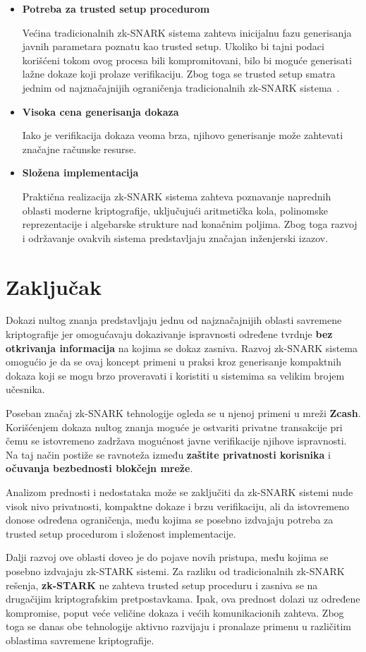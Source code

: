 \begin{itemize}

\item \textbf{Potreba za trusted setup procedurom}

Većina tradicionalnih zk-SNARK sistema zahteva inicijalnu fazu generisanja javnih parametara poznatu kao trusted setup. Ukoliko bi tajni podaci korišćeni tokom ovog procesa bili kompromitovani, bilo bi moguće generisati lažne dokaze koji prolaze verifikaciju. Zbog toga se trusted setup smatra jednim od najznačajnijih ograničenja tradicionalnih zk-SNARK sistema~\cite{nitulescu2023snarks}.

\item \textbf{Visoka cena generisanja dokaza}

Iako je verifikacija dokaza veoma brza, njihovo generisanje može zahtevati značajne računske resurse.

\item \textbf{Složena implementacija}

Praktična realizacija zk-SNARK sistema zahteva poznavanje naprednih oblasti moderne kriptografije, uključujući aritmetička kola, polinomske reprezentacije i algebarske strukture nad konačnim poljima. Zbog toga razvoj i održavanje ovakvih sistema predstavljaju značajan inženjerski izazov.

\end{itemize}


\section{Zaključak}

Dokazi nultog znanja predstavljaju jednu od najznačajnijih oblasti savremene kriptografije jer omogućavaju dokazivanje ispravnosti određene tvrdnje \textbf{bez otkrivanja informacija} na kojima se dokaz zasniva. Razvoj zk-SNARK sistema omogućio je da se ovaj koncept primeni u praksi kroz generisanje kompaktnih dokaza koji se mogu brzo proveravati i koristiti u sistemima sa velikim brojem učesnika.

Poseban značaj zk-SNARK tehnologije ogleda se u njenoj primeni u mreži \textbf{Zcash}. Korišćenjem dokaza nultog znanja moguće je ostvariti privatne transakcije pri čemu se istovremeno zadržava mogućnost javne verifikacije njihove ispravnosti. Na taj način postiže se ravnoteža između \textbf{zaštite privatnosti korisnika} i \textbf{očuvanja bezbednosti blokčejn mreže}.

Analizom prednosti i nedostataka može se zaključiti da zk-SNARK sistemi nude visok nivo privatnosti, kompaktne dokaze i brzu verifikaciju, ali da istovremeno donose određena ograničenja, među kojima se posebno izdvajaju potreba za trusted setup procedurom i složenost implementacije.

Dalji razvoj ove oblasti doveo je do pojave novih pristupa, među kojima se posebno izdvajaju zk-STARK sistemi. Za razliku od tradicionalnih zk-SNARK rešenja, \textbf{zk-STARK} ne zahteva trusted setup proceduru i zasniva se na drugačijim kriptografskim pretpostavkama. Ipak, ova prednost dolazi uz određene kompromise, poput veće veličine dokaza i većih komunikacionih zahteva. Zbog toga se danas obe tehnologije aktivno razvijaju i pronalaze primenu u različitim oblastima savremene kriptografije.
